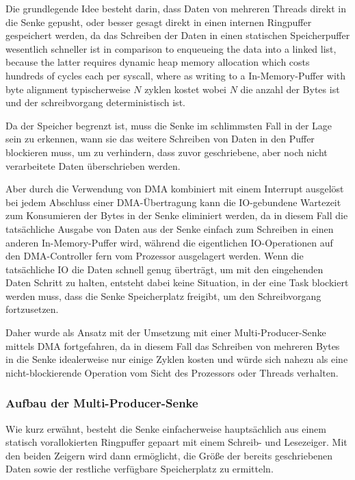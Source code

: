 Die grundlegende Idee besteht darin, dass Daten von mehreren Threads direkt in
die Senke gepusht, oder besser gesagt direkt in einen internen Ringpuffer
gespeichert werden, da das Schreiben der Daten in einen statischen
Speicherpuffer wesentlich schneller ist in comparison to enqueueing the data
into a linked list, because the latter requires dynamic heap memory allocation
which costs hundreds of cycles each per syscall, where as writing to a
In-Memory-Puffer with byte alignment typischerweise $N$ zyklen kostet wobei $N$
die anzahl der Bytes ist und der schreibvorgang deterministisch ist.

Da der Speicher begrenzt ist, muss die Senke im schlimmsten Fall in der Lage
sein zu erkennen, wann sie das weitere Schreiben von Daten in den Puffer
blockieren muss, um zu verhindern, dass zuvor geschriebene, aber noch nicht
verarbeitete Daten überschrieben werden.

Aber durch die Verwendung von DMA kombiniert mit einem Interrupt ausgelöst bei
jedem Abschluss einer DMA-Übertragung kann die IO-gebundene Wartezeit zum
Konsumieren der Bytes in der Senke eliminiert werden, da in diesem Fall die
tatsächliche Ausgabe von Daten aus der Senke einfach zum Schreiben in einen
anderen In-Memory-Puffer wird, während die eigentlichen IO-Operationen auf den
DMA-Controller fern vom Prozessor ausgelagert werden. Wenn die tatsächliche IO
die Daten schnell genug überträgt, um mit den eingehenden Daten Schritt zu
halten, entsteht dabei keine Situation, in der eine Task blockiert werden muss,
dass die Senke Speicherplatz freigibt, um den Schreibvorgang fortzusetzen.

Daher wurde als Ansatz mit der Umsetzung mit einer Multi-Producer-Senke mittels
DMA fortgefahren, da in diesem Fall das Schreiben von mehreren Bytes in die
Senke idealerweise nur einige Zyklen kosten und würde sich nahezu als eine
nicht-blockierende Operation vom Sicht des Prozessors oder Threads verhalten.

\subsubsection{Aufbau der Multi-Producer-Senke}

Wie kurz erwähnt, besteht die Senke einfacherweise hauptsächlich aus einem
statisch vorallokierten Ringpuffer gepaart mit einem Schreib- und Lesezeiger.
Mit den beiden Zeigern wird dann ermöglicht, die Größe der bereits geschriebenen
Daten sowie der restliche verfügbare Speicherplatz zu ermitteln.

